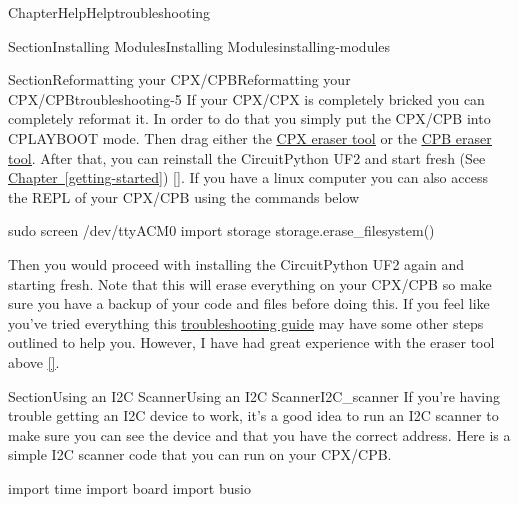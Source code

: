 \documentclass[oneside,10pt,]{book}
\newcommand{\xreffont}{\relax}
\newcommand{\linkhilite}[1]{\underline{#1}}
\numberwithin{equation}{section}
\begin{document}
\begin{chapterptx}{Chapter}{Help}{}{Help}{}{}{troubleshooting}
\begin{sectionptx}{Section}{Installing Modules}{}{Installing Modules}{}{}{installing-modules}
\end{sectionptx}
%
%
\typeout{************************************************}
\typeout{************************************************}
%
\begin{sectionptx}{Section}{Reformatting your CPX\slash{}CPB}{}{Reformatting your CPX\slash{}CPB}{}{}{troubleshooting-5}
If your CPX\slash{}CPX is completely bricked you can completely reformat it. In order to do that you simply put the CPX\slash{}CPB into CPLAYBOOT mode. Then drag either the \href{https://cdn-learn.adafruit.com/assets/assets/000/048/745/original/flash_erase_express.ino.circuitplay.uf2?1512152080}{\linkhilite{CPX eraser tool}} or the \href{https://cdn-learn.adafruit.com/assets/assets/000/082/950/original/CP_Bluefruit_QSPI_Erase.UF2?1572026649}{\linkhilite{CPB eraser tool}}. After that, you can reinstall the CircuitPython UF2 and start fresh (See \hyperref[getting-started]{\linkhilite{Chapter~{\xreffont\ref{getting-started}}}}) \hyperlink{Adafruit}{\linkhilite{[{\xreffont 32}]}}. If you have a linux computer you can also access the REPL of your CPX\slash{}CPB using the commands below\begin{preformatted}
sudo screen /dev/ttyACM0
import storage
storage.erase_filesystem()
\end{preformatted}
Then you would proceed with installing the CircuitPython UF2 again and starting fresh. Note that this will erase everything on your CPX\slash{}CPB so make sure you have a backup of your code and files before doing this. If you feel like you've tried everything this \href{https://learn.adafruit.com/adafruit-circuit-playground-express/troubleshooting}{\linkhilite{troubleshooting guide}} may have some other steps outlined to help you. However, I have had great experience with the eraser tool above \hyperlink{Adafruit}{\linkhilite{[{\xreffont 32}]}}.%
\end{sectionptx}
%
%
\typeout{************************************************}
\typeout{************************************************}
%
\begin{sectionptx}{Section}{Using an I2C Scanner}{}{Using an I2C Scanner}{}{}{I2C_scanner}
If you're having trouble getting an I2C device to work, it's a good idea to run an I2C scanner to make sure you can see the device and that you have the correct address. Here is a simple I2C scanner code that you can run on your CPX\slash{}CPB.%
\begin{preformatted}
import time
import board
import busio


\end{preformatted}
\end{sectionptx}
\end{chapterptx}
\end{document}
